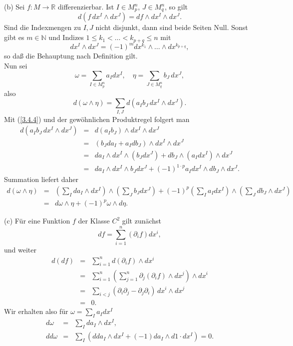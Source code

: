 \documentclass[a4paper,twoside,DIV15,BCOR12mm]{scrbook}
\begin{document}
\noindent
(b) Sei $f: M \to {\mathbb R}$ differenzierbar. Ist $I \in 
M_{p}^{n}$, $J \in M_{q}^{n}$, so gilt
\begin{equation}\label{3.4.4}
d(f\, dx^{I} \wedge dx^{J}) = df \wedge dx^{I} \wedge dx^{J}.
\end{equation}
Sind die Indexmengen zu $I, J$ nicht disjunkt, dann sind beide Seiten 
Null. Sonst gibt es $m \in {\mathbb N}$ und Indizes $1 \le k_{1} < 
\dots < k_{p+q} \le n$ mit
\[ dx^{I} \wedge dx^{J} = (-1)^{m} dx^{k_1} \wedge \dots \wedge 
dx^{k_{p+q}}, \]
so daß die Behauptung nach Definition gilt.\\

\noindent
Nun sei
\[ \omega = \sum_{I \in M_{p}^{n}} a_{I} dx^{I}, \quad \eta = \sum_{J 
\in M_{q}^{n}} b_{J} \, dx^{J}, \]
also
\[ d(\omega \wedge \eta) = \sum_{I,J} d\left(a_{I} b_{J} \, dx^{I} \wedge 
dx^{J}\right). \]
Mit (\ref{3.4.4}) und der gewöhnlichen Produktregel folgert man
\begin{eqnarray*}
 d \left( a_{I} b_{J} \, dx^{I} \wedge dx^{J}\right)& = &
d(a_{I}b_{J}) \wedge dx^{I} \wedge dx^{J} \\
& = & (b_{J} da_{I} + a_{I} db_{J}) \wedge dx^{I} \wedge dx^{J} \\
& = & da_{I} \wedge dx^{I} \wedge (b_{J} dx^{J}) + db_{J} \wedge 
(a_{I} dx^{I}) \wedge dx^{J} \\
& = & da_{I} \wedge dx^{I} \wedge b_{J} dx^{J} + (-1)^{1 \cdot p} 
a_{I} dx^{I} \wedge db_{J} \wedge dx^{J}.
\end{eqnarray*}
Summation liefert daher
\begin{eqnarray*}
 d(\omega \wedge \eta) 
& = & \left(\sum_{I} da_{I} \wedge dx^{I}\right) \wedge 
\left(\sum_{J} b_{J} dx^{J}\right) + (-1)^{p} \left(\sum_{I} a_{I} 
dx^{I}\right) \wedge \left(\sum_{J} db_{J} \wedge dx^{J}\right) \\
& = & d\omega \wedge \eta + (-1)^{p} \omega \wedge d\eta.
\end{eqnarray*}



\noindent
(c) Für eine Funktion $f$ der Klasse $C^{2}$ gilt zunächst
\[ df = \sum_{i=1}^{n} (\partial_{i}f) dx^{i}, \]
und weiter
\begin{eqnarray*}
d(df) & = & \sum_{i=1}^{n} d(\partial_{i}f) \wedge dx^{i} \\
& = & \sum_{i=1}^{n} \left(\sum_{j=1}^{n} \partial_{j} 
(\partial_{i}f) \wedge dx^{j}\right) \wedge dx^{i} \\
& = & \sum_{i < j} (\partial_{i} \partial_{j} - \partial_{j} 
\partial_{i}) \, dx^{i} \wedge dx^{j} \\
& = & 0.
\end{eqnarray*}
Wir erhalten also für $\omega = \sum_{I} a_{I} dx^{I}$
\begin{eqnarray*}
d\omega & = & \sum_{I} da_{I} \wedge dx^{I}, \\
dd\omega & = & \sum_{I} \left( dd a_{I} \wedge dx^{I}+(-1) da_{I} 
\wedge d 1\cdot dx^{I}\right) = 0.
\end{eqnarray*}
\end{document}
